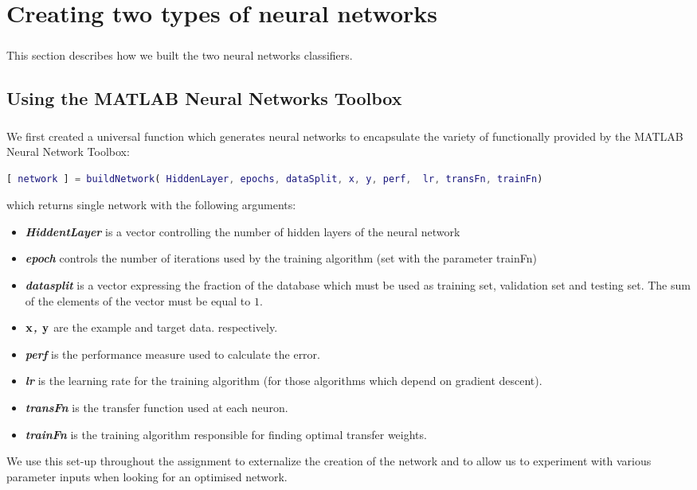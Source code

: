 \documentclass[a4paper,12pt,oneside,final]{report}
\newenvironment{changemargin}[2]{\begin{list}{}{%
\setlength{\topsep}{0pt}%
\setlength{\leftmargin}{0pt}%
\setlength{\rightmargin}{0pt}%
\setlength{\listparindent}{\parindent}%
\setlength{\itemindent}{\parindent}%
\setlength{\parsep}{0pt plus 1pt}%
\addtolength{\leftmargin}{#1}%
\addtolength{\rightmargin}{#2}%
}\item }{\end{list}}
\begin{document}
\chapter{Creating two types of neural networks}
\paragraph{}
This section describes how we built the two neural networks classifiers.
\section{Using the MATLAB Neural Networks Toolbox}
\paragraph{} 
We first created a universal function which generates neural networks to encapsulate the variety of functionally provided by the MATLAB Neural Network Toolbox:
\begin{changemargin}{-5mm}{-5mm}
\begin{lstlisting}[language=Matlab, frame=single]
[ network ] = buildNetwork( HiddenLayer, epochs, dataSplit, x, y, perf,  lr, transFn, trainFn)
\end{lstlisting}
\end{changemargin}
which returns single network with the following arguments:
\label{ch:build}
\begin{itemize}
\item {\bf \textit{HiddentLayer} } is a vector controlling the number of hidden layers of the neural network
\item {\bf \textit{epoch} } controls the number of iterations used by the training algorithm (set with the parameter trainFn)
\item {\bf \textit{datasplit} } is a vector expressing the fraction of the database which must be used as training set, validation set and testing set. The sum of the elements of the vector must be equal to $1$.
\item {\bf \textit{$\bf x$, $\bf y$} } are the example and target data. respectively.
\item {\bf \textit{perf} } is the performance measure used to calculate the error.
\item {\bf \textit{lr} } is the learning rate for the training algorithm (for those algorithms which depend on gradient descent).
\item {\bf \textit{transFn} } is the transfer function used at each neuron.
\item {\bf \textit{trainFn} } is the training algorithm responsible for finding optimal transfer weights.
\end{itemize}
We use this set-up throughout the assignment to externalize the creation of the network and to allow us to experiment with various parameter inputs when looking for an optimised network.
\end{document}
